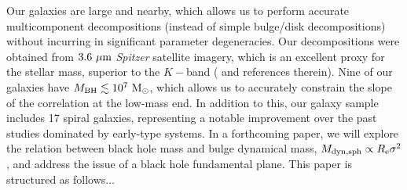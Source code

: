 \documentclass[preprint2]{emulateapj}
\begin{document}
Our galaxies are large and nearby, which allows us to perform accurate multicomponent decompositions 
(instead of simple bulge/disk decompositions) without incurring in significant parameter degeneracies. 
Our decompositions were obtained from $3.6\rm~\mu m$ \emph{Spitzer} satellite imagery, 
which is an excellent proxy for the stellar mass, superior to the $K-$band (\citealt{sheth2010} and references therein).
Nine of our galaxies have $M_{\rm BH} \lesssim 10^7\rm~M_\odot$, 
which allows us to accurately constrain the slope of the correlation at the low-mass end.
In addition to this, our galaxy sample includes 17 spiral galaxies, 
representing a notable improvement over the past studies dominated by early-type systems. 
In a forthcoming paper, we will explore the relation between black hole mass and bulge dynamical mass, 
$M_{\rm dyn,sph} \propto R_{\rm e} \sigma^2$, and address the issue of a black hole fundamental plane.
This paper is structured as follows... 
\end{document}
